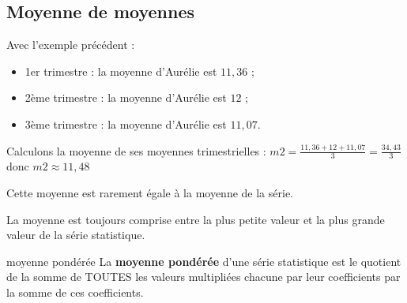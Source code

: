 \subsection*{Moyenne de moyennes}
\begin{Ex}
		
Avec l'exemple précédent :
\begin{itemize}
\item 		1er trimestre :	  la moyenne d'Aurélie est $11,36$ ;
\item		2ème trimestre : la moyenne d'Aurélie est $12$ ;
\item		3ème trimestre : la moyenne d'Aurélie est $11,07$.
\end{itemize}
Calculons la moyenne de ses moyennes trimestrielles :
		$m2 =\frac{11,36+12+11,07}{3}=\frac{34,43}{3}$ donc  		$m2\approx 11,48$
\end{Ex}
				
		
		
\begin{Rq}	
Cette moyenne est rarement égale à la moyenne de la série.

La moyenne est toujours comprise entre la plus petite valeur et la plus grande valeur de la série statistique.
\end{Rq}



\begin{AD}

\end{AD}

\begin{AD}

\end{AD}

\begin{Exo}

\end{Exo}



\begin{DefT}{moyenne pondérée}
La \textbf{moyenne pondérée} d’une série statistique est le quotient de la somme
de TOUTES les valeurs multipliées chacune par leur coefficients
par la somme de ces coefficients.
\end{DefT}

\begin{AD}

\end{AD}

\begin{AD}

\end{AD}

\begin{AD}

\end{AD}

